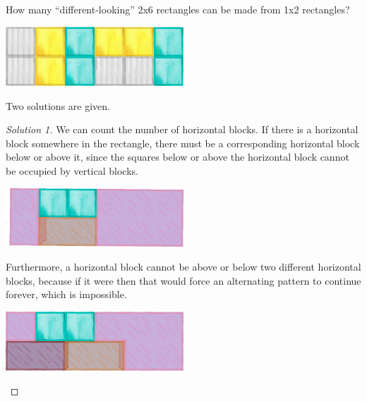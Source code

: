 \documentclass[12pt]{article}
\begin{document}
    \begin{myprob}{}{}
        How many ``different-looking'' 2x6 rectangles can be made from 1x2 rectangles?
        \begin{center}
            \includegraphics[width=0.5\textwidth]{Fig2.png}
        \end{center}
        Two solutions are given.
        \begin{proof}[Solution 1]
            We can count the number of horizontal blocks. If there is a horizontal block somewhere in the rectangle, there must be a corresponding horizontal block below or above it, since the squares below or above the horizontal block cannot be occupied by vertical blocks.
            
            \begin{center}
                \includegraphics[width=0.5\textwidth]{Fig3.png}
            \end{center}

            Furthermore, a horizontal block cannot be above or below two different horizontal blocks, because if it were then that would force an alternating pattern to continue forever, which is impossible.
            
            \begin{center}
                \includegraphics[width=0.5\textwidth]{Fig4.png}
            \end{center}


\end{proof}
\end{myprob}
\end{document}
